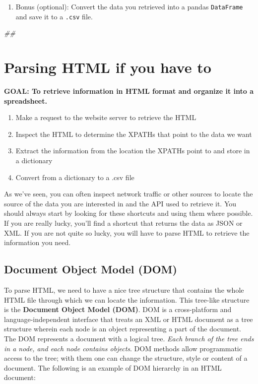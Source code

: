 \documentclass[
]{book}
\newenvironment{Shaded}{\begin{snugshade}}{\end{snugshade}}
\newcommand{\CommentTok}[1]{\textcolor[rgb]{0.56,0.35,0.01}{\textit{#1}}}
\providecommand{\tightlist}{%
  \setlength{\itemsep}{0pt}\setlength{\parskip}{0pt}}
\begin{document}
\begin{enumerate}
\def\labelenumi{\arabic{enumi}.}
\setcounter{enumi}{3}
\tightlist
\item
  Bonus (optional): Convert the data you retrieved into a pandas
  \texttt{DataFrame} and save it to a \texttt{.csv} file.
\end{enumerate}

\begin{Shaded}
\begin{Highlighting}[]
\CommentTok{##}
\end{Highlighting}
\end{Shaded}

\hypertarget{parsing-html-if-you-have-to}{%
\section{Parsing HTML if you have to}\label{parsing-html-if-you-have-to}}

\textbf{GOAL: To retrieve information in HTML format and organize it into a spreadsheet.}

\begin{enumerate}
\def\labelenumi{\arabic{enumi}.}
\tightlist
\item
  Make a request to the website server to retrieve the HTML
\item
  Inspect the HTML to determine the XPATHs that point to the data we want
\item
  Extract the information from the location the XPATHs point to and store in a dictionary
\item
  Convert from a dictionary to a .csv file
\end{enumerate}

As we've seen, you can often inspect network traffic or other sources
to locate the source of the data you are interested in and the API
used to retrieve it. You should always start by looking for these
shortcuts and using them where possible. If you are really lucky,
you'll find a shortcut that returns the data as JSON or XML. If you
are not quite so lucky, you will have to parse HTML to retrieve the
information you need.

\hypertarget{document-object-model-dom}{%
\subsection{Document Object Model (DOM)}\label{document-object-model-dom}}

To parse HTML, we need to have a nice tree structure that contains the whole HTML
file through which we can locate the information. This tree-like structure is the
\textbf{Document Object Model (DOM)}. DOM is a cross-platform and language-independent
interface that treats an XML or HTML document as a tree structure wherein each node
is an object representing a part of the document. The DOM represents a document with
a logical tree. \emph{Each branch of the tree ends in a node, and each node contains objects}.
DOM methods allow programmatic access to the tree; with them one can change the structure,
style or content of a document. The following is an example of DOM hierarchy in an HTML document:
\end{document}
